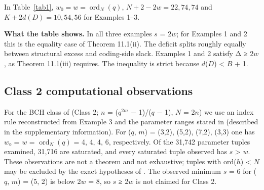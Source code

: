 \documentclass[pdflatex,sn-mathphys-num]{sn-jnl}
\theoremstyle{thmstyleone}
\theoremstyle{thmstylethree}
\begin{document}
\begin{table}[h]
\caption{Calibration of the three examples of \cite{LZ22}. All entries are computed, except the column $d(D)$~\cite{LZ22}, which gives the lower bounds printed in \cite{LZ22}. In all three cases $\deg g_C = B + s$ and $\mathrm{ord}(h) = N$.}\label{tab1}
\centering\small\setlength{\tabcolsep}{3.5pt}
\end{table}


In Table~\ref{tab1}, \(w_0=w=\operatorname{ord}_N(q)\), \(N+2-2w=22,74,74\) and \(K+2d(D)=10,54,56\) for Examples 1--3.

\textbf{What the table shows.} In all three examples \(s\) = 2\(w\); for Examples 1 and 2 this is the equality case of Theorem 11.1(ii). The deficit splits roughly equally between structural excess and coding-side slack. Examples 1 and 2 satisfy Δ ≥ 2\(w\), as Theorem 11.1(iii) requires. The inequality is strict because \(d\)(\(D\)) \textless{} \(B\) + 1.

\subsection{Class 2 computational observations}

For the BCH class of \cite{LZ22} (Class 2; \(n\) = (\(q^{2m}\) − 1)/(\(q\) − 1), \(N\) = 2\(n\)) we use an index rule reconstructed from Example 3 and the parameter ranges stated in \cite{LZ22} (described in the supplementary information). For (\(q\), \(m\)) = (3,2), (5,2), (7,2), (3,3) one has \(w\)₀ = \(w\) = \(\operatorname{ord}_N(q)\) = 4, 4, 4, 6, respectively. Of the 31,742 parameter tuples examined, 31,716 are saturated, and every saturated tuple observed has \(s\) \textgreater{} \(w\). These observations are not a theorem and not exhaustive; tuples with ord(\(h\)) \textless{} \(N\) may be excluded by the exact hypotheses of \cite{LZ22}. The observed minimum \(s\) = 6 for (\(q\), \(m\)) = (5, 2) is below 2\(w\) = 8, so \(s\) ≥ 2\(w\) is not claimed for Class 2.
\end{document}
